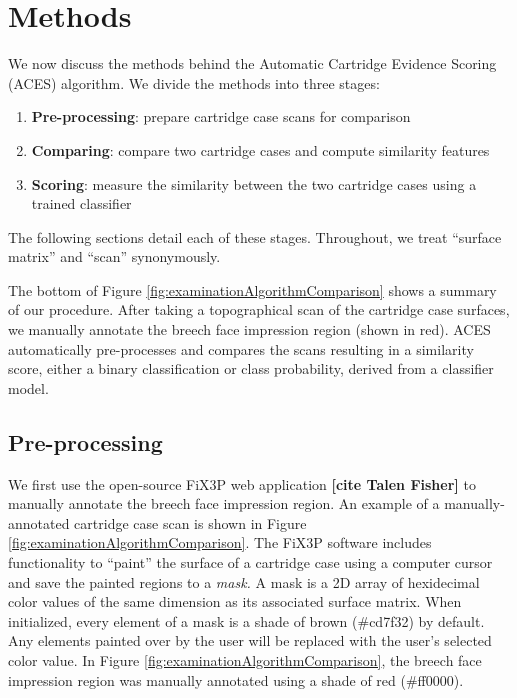 \documentclass[11pt,]{isuthesis}
\begin{document}
\hypertarget{methods}{%
\section{Methods}\label{methods}}

We now discuss the methods behind the Automatic Cartridge Evidence Scoring (ACES) algorithm. We divide the methods into three stages:

\begin{enumerate}
\def\labelenumi{\arabic{enumi}.}
\item
  \textbf{Pre-processing}: prepare cartridge case scans for comparison
\item
  \textbf{Comparing}: compare two cartridge cases and compute similarity features
\item
  \textbf{Scoring}: measure the similarity between the two cartridge cases using a trained classifier
\end{enumerate}

The following sections detail each of these stages.
Throughout, we treat ``surface matrix'' and ``scan'' synonymously.

The bottom of Figure \ref{fig:examinationAlgorithmComparison} shows a summary of our procedure.
After taking a topographical scan of the cartridge case surfaces, we manually annotate the breech face impression region (shown in red).
ACES automatically pre-processes and compares the scans resulting in a similarity score, either a binary classification or class probability, derived from a classifier model.

\hypertarget{pre-processing}{%
\subsection{Pre-processing}\label{pre-processing}}

We first use the open-source FiX3P web application \textbf{{[}cite Talen Fisher{]}} to manually annotate the breech face impression region.
An example of a manually-annotated cartridge case scan is shown in Figure \ref{fig:examinationAlgorithmComparison}.
The FiX3P software includes functionality to ``paint'' the surface of a cartridge case using a computer cursor and save the painted regions to a \emph{mask.} A mask is a 2D array of hexidecimal color values of the same dimension as its associated surface matrix.
When initialized, every element of a mask is a shade of brown (\#cd7f32) by default.
Any elements painted over by the user will be replaced with the user's selected color value.
In Figure \ref{fig:examinationAlgorithmComparison}, the breech face impression region was manually annotated using a shade of red (\#ff0000).
\end{document}
